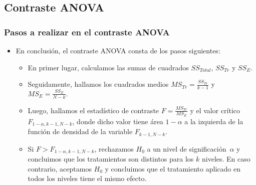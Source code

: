 \subsection{Contraste ANOVA}
\begin{frame}
\frametitle{Pasos a realizar en el contraste ANOVA}
\begin{itemize}
\item<2-> En conclusión, el contraste ANOVA consta de los pasos siguientes:
\begin{itemize}
\item<3-> En primer lugar, calculamos las sumas de cuadrados $SS_{Total}$, $SS_{Tr}$ y $SS_E$.
\item<4-> Seguidamente, hallamos los cuadrados medios $MS_{Tr}=\frac{SS_{Tr}}{k-1}$ y $MS_E=\frac{SS_E}{N-k}.$
\item<5-> Luego, hallamos el estadístico de contraste $F=\frac{MS_{Tr}}{MS_E}$ y el valor crítico $F_{1-\alpha,k-1,N-k}$, donde dicho valor tiene
área $1-\alpha$ a la izquierda de la función de densidad de la variable $F_{k-1,N-k}$.
\item<6-> Si $F > F_{1-\alpha,k-1,N-k}$, rechazamos $H_0$ a un nivel de significación~$\alpha$ y concluimos que los tratamientos son distintos para
los $k$ niveles. En caso contrario, aceptamos $H_0$ y concluimos que el tratamiento aplicado en todos los niveles tiene el mismo efecto. 
\end{itemize}
\end{itemize}
\end{frame}
